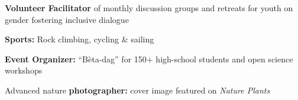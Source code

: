 \documentclass[a4paper,10pt]{article}
\begin{document}
\begin{description}
  \raggedright
  \item \textbf{Volunteer Facilitator} of monthly discussion groups and retreats for youth on gender fostering inclusive dialogue
  \item \textbf{Sports:} Rock climbing, cycling \& sailing
  \item \textbf{Event Organizer:} “Bèta-dag” for 150+ high-school students and open science workshops
  \item Advanced nature \textbf{photographer:} cover image featured on \emph{Nature Plants}
\end{description}
\end{document}
